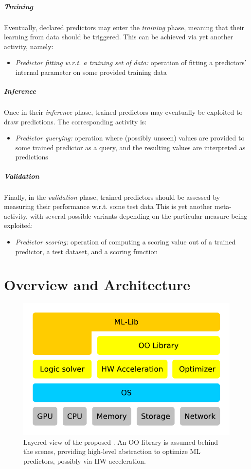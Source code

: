 \documentclass[runningheads]{llncs}
\begin{document}
\subparagraph{Training}
%
Eventually, declared predictors may enter the \emph{training} phase, meaning that their learning from data should be triggered.
%
This can be achieved via yet another activity, namely:
\begin{itemize}
    \item \emph{Predictor fitting w.r.t. a training set of data:} operation of fitting a predictors' internal parameter on some provided training data
\end{itemize}

\subparagraph{Inference}
%
Once in their \emph{inference} phase, trained predictors may eventually be exploited to draw predictions.
The corresponding activity is:
\begin{itemize}
    \item \emph{Predictor querying:} operation where (possibly unseen) values are provided to some trained predictor as a query, and the resulting values are interpreted as predictions
\end{itemize}

\subparagraph{Validation}
%
Finally, in the \emph{validation} phase, trained predictors should be assessed by measuring their performance w.r.t. some test data
%
This is yet another meta-activity, with several possible variants depending on the particular measure being exploited:
%
\begin{itemize}
    \item \emph{Predictor scoring:} operation of computing a scoring value out of a trained predictor, a test dataset, and a scoring function
\end{itemize}


\section{\mllib{} Overview and Architecture}

\begin{figure}[t]
    \centering
    \includegraphics[width=.5\linewidth]{figures/layers.pdf}
    \caption{Layered view of the proposed \mllib{}. An OO library is assumed behind the scenes, providing high-level abstraction to optimize ML predictors, possibly via HW acceleration.}
    \label{fig:layers}
\end{figure}
\end{document}
